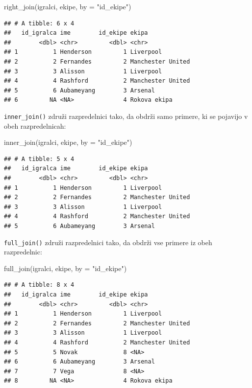 \documentclass[
]{book}
\newenvironment{Shaded}{\begin{snugshade}}{\end{snugshade}}
\newcommand{\AttributeTok}[1]{\textcolor[rgb]{0.77,0.63,0.00}{#1}}
\newcommand{\FunctionTok}[1]{\textcolor[rgb]{0.00,0.00,0.00}{#1}}
\newcommand{\NormalTok}[1]{#1}
\newcommand{\StringTok}[1]{\textcolor[rgb]{0.31,0.60,0.02}{#1}}
\begin{document}
\begin{Shaded}
\begin{Highlighting}[]
\FunctionTok{right\_join}\NormalTok{(igralci, ekipe, }\AttributeTok{by =} \StringTok{"id\_ekipe"}\NormalTok{)}
\end{Highlighting}
\end{Shaded}

\begin{verbatim}
## # A tibble: 6 x 4
##   id_igralca ime        id_ekipe ekipa            
##        <dbl> <chr>         <dbl> <chr>            
## 1          1 Henderson         1 Liverpool        
## 2          2 Fernandes         2 Manchester United
## 3          3 Alisson           1 Liverpool        
## 4          4 Rashford          2 Manchester United
## 5          6 Aubameyang        3 Arsenal          
## 6         NA <NA>              4 Rokova ekipa
\end{verbatim}

\texttt{inner\_join()} združi razpredelnici tako, da obdrži samo primere, ki se pojavijo v obeh razpredelnicah:

\begin{Shaded}
\begin{Highlighting}[]
\FunctionTok{inner\_join}\NormalTok{(igralci, ekipe, }\AttributeTok{by =} \StringTok{"id\_ekipe"}\NormalTok{)}
\end{Highlighting}
\end{Shaded}

\begin{verbatim}
## # A tibble: 5 x 4
##   id_igralca ime        id_ekipe ekipa            
##        <dbl> <chr>         <dbl> <chr>            
## 1          1 Henderson         1 Liverpool        
## 2          2 Fernandes         2 Manchester United
## 3          3 Alisson           1 Liverpool        
## 4          4 Rashford          2 Manchester United
## 5          6 Aubameyang        3 Arsenal
\end{verbatim}

\texttt{full\_join()} združi razpredelnici tako, da obdrži vse primere iz obeh razpredelnic:

\begin{Shaded}
\begin{Highlighting}[]
\FunctionTok{full\_join}\NormalTok{(igralci, ekipe, }\AttributeTok{by =} \StringTok{"id\_ekipe"}\NormalTok{)}
\end{Highlighting}
\end{Shaded}

\begin{verbatim}
## # A tibble: 8 x 4
##   id_igralca ime        id_ekipe ekipa            
##        <dbl> <chr>         <dbl> <chr>            
## 1          1 Henderson         1 Liverpool        
## 2          2 Fernandes         2 Manchester United
## 3          3 Alisson           1 Liverpool        
## 4          4 Rashford          2 Manchester United
## 5          5 Novak             8 <NA>             
## 6          6 Aubameyang        3 Arsenal          
## 7          7 Vega              8 <NA>             
## 8         NA <NA>              4 Rokova ekipa
\end{verbatim}
\end{document}

